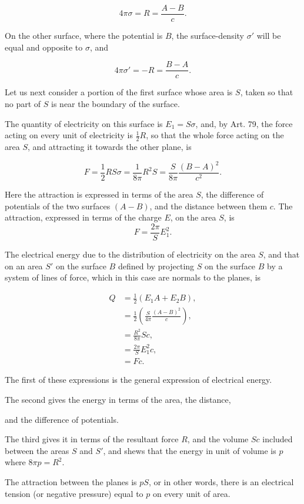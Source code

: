 \documentclass[11pt,a4paper]{article}
\begin{document}
\[
4\pi\sigma = R = \frac{A-B}{c}.
\]

On the other surface, where the potential is $B$, the surface-density $\sigma'$ will be equal and opposite to $\sigma$, and

\[
4\pi\sigma' = -R = \frac{B-A}{c}.
\]

Let us next consider a portion of the first surface whose area is $S$, taken so that no part of $S$ is near the boundary of the surface.

The quantity of electricity on this surface is $E_1=S\sigma$, and, by Art. 79, the force acting on every unit of electricity is $\frac{1}{2}R$, so that the whole force acting on the area $S$, and attracting it towards the other plane, is

\[
F=\frac{1}{2}RS\sigma=\frac{1}{8\pi}R^2S
  =\frac{S}{8\pi}\frac{(B-A)^2}{c^2}.
\]

Here the attraction is expressed in terms of the area $S$, the difference of potentials of the two surfaces $(A-B)$, and the distance between them $c$. The attraction, expressed in terms of the charge $E$, on the area $S$, is
\[
F=\frac{2\pi}{S}E_1^2.
\]

The electrical energy due to the distribution of electricity on the area $S$, and that on an area $S'$ on the surface $B$ defined by projecting $S$ on the surface $B$ by a system of lines of force, which in this case are normals to the planes, is

\[
\begin{aligned}
Q&=\frac{1}{2}(E_1A+E_2B),\\
 &=\frac{1}{2}\left(\frac{S}{4\pi}\frac{(A-B)^2}{c}\right),\\
 &=\frac{R^2}{8\pi}Sc,\\
 &=\frac{2\pi}{S}E_1^2c,\\
 &=Fc.
\end{aligned}
\]

The first of these expressions is the general expression of electrical energy.

The second gives the energy in terms of the area, the distance,

and the difference of potentials.

The third gives it in terms of the resultant force $R$, and the volume $Sc$ included between the areas $S$ and $S'$, and shews that the energy in unit of volume is $p$ where $8\pi p=R^2$.

The attraction between the planes is $pS$, or in other words, there is an electrical tension (or negative pressure) equal to $p$ on every unit of area.
\end{document}
